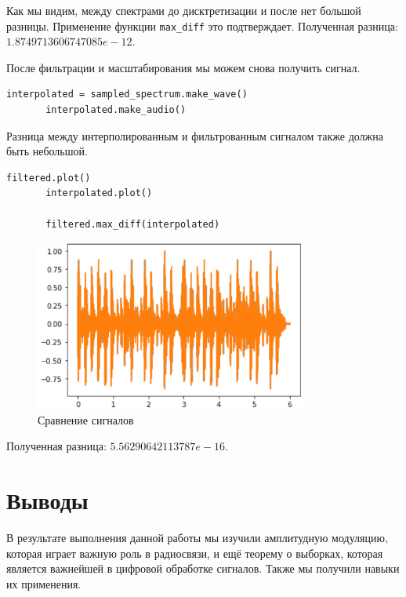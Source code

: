 \documentclass[a4paper,12pt]{report}
\begin{document}
    Как мы видим, между спектрами до дисктретизации и после нет большой разницы. Применение функции \texttt{max\_diff} это подтверждает. Полученная разница: $1.8749713606747085e-12$.
    
    После фильтрации и масштабирования мы можем снова получить сигнал.
\begin{lstlisting}[caption=Получение сигнала]
       interpolated = sampled_spectrum.make_wave()
       interpolated.make_audio()
\end{lstlisting}  

    Разница между интерполированным и фильтрованным сигналом также должна быть небольшой. 
\begin{lstlisting}[caption=Сравнение интерполированного и фильтрованного сигналов]
       filtered.plot()
       interpolated.plot()

       filtered.max_diff(interpolated)
\end{lstlisting}
\begin{figure}[H]
        \centering
        \includegraphics[width=0.8\textwidth]{fig3-7.PNG}
        \caption{Сравнение сигналов}
        \label{fig:fig3-7}
\end{figure}

    Полученная разница: $5.56290642113787e-16$.
\chapter{Выводы}
    В результате выполнения данной работы мы изучили амплитудную модуляцию, которая играет важную роль в радиосвязи, и ещё теорему о выборках, которая является важнейшей в цифровой обработке сигналов. Также мы получили навыки их применения.
\end{document}
